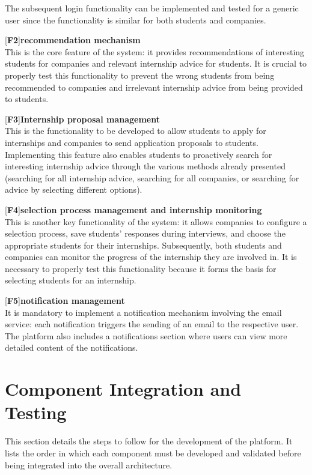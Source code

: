 The subsequent login functionality can be implemented and tested for a generic user since the functionality is similar for both students and companies.

[\textbf{F2}]\textbf{recommendation mechanism}\\
This is the core feature of the system: it provides recommendations of interesting students for companies and relevant internship advice for students. It is crucial to properly test this functionality to prevent the wrong students from being recommended to companies and irrelevant internship advice from being provided to students.

[\textbf{F3}]\textbf{Internship proposal management}\\
This is the functionality to be developed to allow students to apply for internships and companies to send application proposals to students. Implementing this feature also enables students to proactively search for interesting internship advice through the various methods already presented (searching for all internship advice, searching for all companies, or searching for advice by selecting different options).

[\textbf{F4}]\textbf{selection process management and internship monitoring}\\
This is another key functionality of the system: it allows companies to configure a selection process, save students' responses during interviews, and choose the appropriate students for their internships. Subsequently, both students and companies can monitor the progress of the internship they are involved in. It is necessary to properly test this functionality because it forms the basis for selecting students for an internship.

[\textbf{F5}]\textbf{notification management} \\
It is mandatory to implement a notification mechanism involving the email service: each notification triggers the sending of an email to the respective user. The platform also includes a notifications section where users can view more detailed content of the notifications.

\section{Component Integration and Testing}

This section details the steps to follow for the development of the platform. It lists the order in which each component must be developed and validated before being integrated into the overall architecture.

